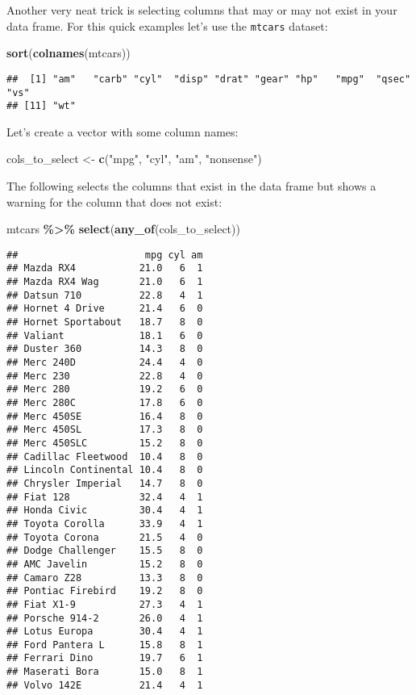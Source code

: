 \documentclass[
]{article}
\newenvironment{Shaded}{\begin{snugshade}}{\end{snugshade}}
\newcommand{\KeywordTok}[1]{\textcolor[rgb]{0.13,0.29,0.53}{\textbf{#1}}}
\newcommand{\NormalTok}[1]{#1}
\newcommand{\OperatorTok}[1]{\textcolor[rgb]{0.81,0.36,0.00}{\textbf{#1}}}
\newcommand{\StringTok}[1]{\textcolor[rgb]{0.31,0.60,0.02}{#1}}
\begin{document}
Another very neat trick is selecting columns that may or may not exist in your data frame. For this quick examples
let's use the \texttt{mtcars} dataset:

\begin{Shaded}
\begin{Highlighting}[]
\KeywordTok{sort}\NormalTok{(}\KeywordTok{colnames}\NormalTok{(mtcars))}
\end{Highlighting}
\end{Shaded}

\begin{verbatim}
##  [1] "am"   "carb" "cyl"  "disp" "drat" "gear" "hp"   "mpg"  "qsec" "vs"  
## [11] "wt"
\end{verbatim}

Let's create a vector with some column names:

\begin{Shaded}
\begin{Highlighting}[]
\NormalTok{cols\_to\_select \textless{}{-}}\StringTok{ }\KeywordTok{c}\NormalTok{(}\StringTok{"mpg"}\NormalTok{, }\StringTok{"cyl"}\NormalTok{, }\StringTok{"am"}\NormalTok{, }\StringTok{"nonsense"}\NormalTok{)}
\end{Highlighting}
\end{Shaded}

The following selects the columns that exist
in the data frame but shows a warning for the column that does not exist:

\begin{Shaded}
\begin{Highlighting}[]
\NormalTok{mtcars }\OperatorTok{\%\textgreater{}\%}
\StringTok{  }\KeywordTok{select}\NormalTok{(}\KeywordTok{any\_of}\NormalTok{(cols\_to\_select))}
\end{Highlighting}
\end{Shaded}

\begin{verbatim}
##                      mpg cyl am
## Mazda RX4           21.0   6  1
## Mazda RX4 Wag       21.0   6  1
## Datsun 710          22.8   4  1
## Hornet 4 Drive      21.4   6  0
## Hornet Sportabout   18.7   8  0
## Valiant             18.1   6  0
## Duster 360          14.3   8  0
## Merc 240D           24.4   4  0
## Merc 230            22.8   4  0
## Merc 280            19.2   6  0
## Merc 280C           17.8   6  0
## Merc 450SE          16.4   8  0
## Merc 450SL          17.3   8  0
## Merc 450SLC         15.2   8  0
## Cadillac Fleetwood  10.4   8  0
## Lincoln Continental 10.4   8  0
## Chrysler Imperial   14.7   8  0
## Fiat 128            32.4   4  1
## Honda Civic         30.4   4  1
## Toyota Corolla      33.9   4  1
## Toyota Corona       21.5   4  0
## Dodge Challenger    15.5   8  0
## AMC Javelin         15.2   8  0
## Camaro Z28          13.3   8  0
## Pontiac Firebird    19.2   8  0
## Fiat X1-9           27.3   4  1
## Porsche 914-2       26.0   4  1
## Lotus Europa        30.4   4  1
## Ford Pantera L      15.8   8  1
## Ferrari Dino        19.7   6  1
## Maserati Bora       15.0   8  1
## Volvo 142E          21.4   4  1
\end{verbatim}
\end{document}
